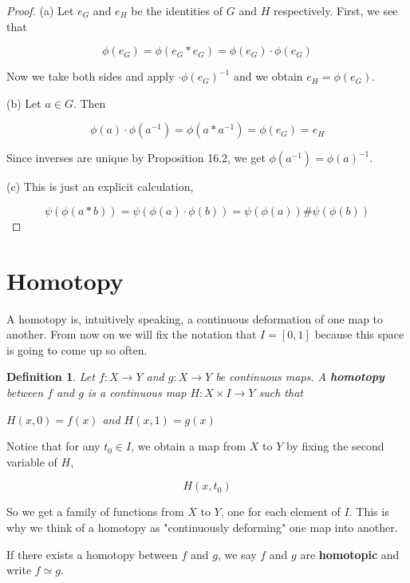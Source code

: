 \documentclass[a4paper]{article}
\newtheorem{definition}[theorem]{Definition}
\numberwithin{theorem}{section}
\begin{document}
\begin{proof}
(a) Let $e_G$ and $e_H$ be the identities of $G$ and $H$ respectively. First, we see that 

$$\phi(e_G) = \phi(e_G \ast e_G) = \phi(e_G) \cdot \phi(e_G) $$

Now we take both sides and apply $\cdot \phi(e_G)^{-1}$ and we obtain $e_H = \phi(e_G)$.

(b) Let $a \in G$. Then

$$ \phi(a) \cdot \phi(a^{-1}) = \phi(a \ast a^{-1}) = \phi(e_G) = e_H $$

Since inverses are unique by Proposition 16.2, we get $\phi(a^{-1}) = \phi(a)^{-1}$.

(c) This is just an explicit calculation,

$$ \psi(\phi(a \ast b)) = \psi(\phi(a) \cdot \phi(b)) = \psi(\phi(a)) \# \psi(\phi(b)) $$

\end{proof}


\section{Homotopy}
A homotopy is, intuitively speaking, a continuous deformation of one map to another. From now on we will fix the notation that $I = [0,1]$ because this space is going to come up so often.

\begin{definition}
Let $f: X \rightarrow Y$ and $g: X \rightarrow Y$ be continuous maps. A \textbf{homotopy} between $f$ and $g$ is a continuous map $H: X \times I \rightarrow Y$ such that 

\begin{center}
$H(x,0) = f(x)$ \hspace{0.2cm}  and  \hspace{0.2cm} $H(x,1) = g(x)$
\end{center}
\end{definition}

Notice that for any $t_0 \in I$, we obtain a map from $X$ to $Y$ by fixing the second variable of $H$,

$$ H(x,t_0) $$

So we get a family of functions from $X$ to $Y$, one for each element of $I$. This is why we think of a homotopy as "continuously deforming" one map into another.

If there exists a homotopy between $f$ and $g$, we say $f$ and $g$ are \textbf{homotopic} and write $f \simeq g$.
\end{document}
